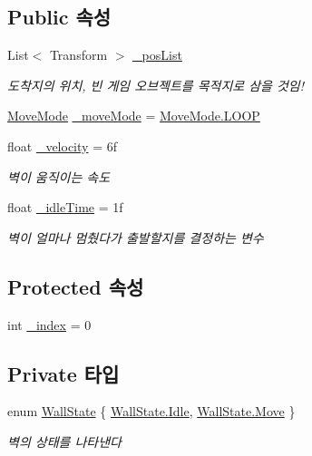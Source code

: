 \subsection*{Public 속성}
\begin{DoxyCompactItemize}
\item 
List$<$ Transform $>$ \mbox{\hyperlink{class_moving_platform_a51c0ce96c3fc6ad9350dc0350216835b}{\+\_\+pos\+List}}
\begin{DoxyCompactList}\small\item\em 도착지의 위치, 빈 게임 오브젝트를 목적지로 삼을 것임! \end{DoxyCompactList}\item 
\mbox{\hyperlink{class_moving_platform_a7b3427d2906069ecf4c39d69eee53653}{Move\+Mode}} \mbox{\hyperlink{class_moving_platform_a47308284bdf720a8fe919a69f2c0019b}{\+\_\+move\+Mode}} = \mbox{\hyperlink{class_moving_platform_a7b3427d2906069ecf4c39d69eee53653a9159b3578e4e1eb31ffdf90acd6f6e40}{Move\+Mode.\+L\+O\+OP}}
\item 
float \mbox{\hyperlink{class_moving_platform_a831cd24df75aa37f0897741d189686a7}{\+\_\+velocity}} = 6f
\begin{DoxyCompactList}\small\item\em 벽이 움직이는 속도 \end{DoxyCompactList}\item 
float \mbox{\hyperlink{class_moving_platform_a293066859b3576c931eb4b8c3f802397}{\+\_\+idle\+Time}} = 1f
\begin{DoxyCompactList}\small\item\em 벽이 얼마나 멈췄다가 출발할지를 결정하는 변수 \end{DoxyCompactList}\end{DoxyCompactItemize}
\subsection*{Protected 속성}
\begin{DoxyCompactItemize}
\item 
int \mbox{\hyperlink{class_moving_platform_a20948e50a50c338c4e62f84a633868ac}{\+\_\+index}} = 0
\end{DoxyCompactItemize}
\subsection*{Private 타입}
\begin{DoxyCompactItemize}
\item 
enum \mbox{\hyperlink{class_moving_platform_ac47e764b71989317aab0bad26d82a901}{Wall\+State}} \{ \mbox{\hyperlink{class_moving_platform_ac47e764b71989317aab0bad26d82a901ae599161956d626eda4cb0a5ffb85271c}{Wall\+State.\+Idle}}, 
\mbox{\hyperlink{class_moving_platform_ac47e764b71989317aab0bad26d82a901a6bc362dbf494c61ea117fe3c71ca48a5}{Wall\+State.\+Move}}
 \}
\begin{DoxyCompactList}\small\item\em 벽의 상태를 나타낸다 \end{DoxyCompactList}\end{DoxyCompactItemize}
